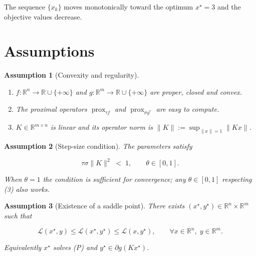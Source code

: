 \documentclass{article}
\newtheorem{assumption}{Assumption}
\newcommand{\prox}{\operatorname{prox}}
\newcommand{\R}{\mathbb{R}}
\begin{document}
The sequence $\{x_k\}$ moves monotonically toward the optimum $x^{\star}=3$ and the objective values decrease.

\newpage
\section*{Assumptions}
\begin{assumption}[Convexity and regularity]\label{as:conv}
\begin{enumerate}
\item $f:\R^{n}\to\R\cup\{+\infty\}$ and $g:\R^{m}\to\R\cup\{+\infty\}$ are proper, closed and convex.
\item The proximal operators $\prox_{\tau f}$ and $\prox_{\sigma g^{*}}$ are easy to compute.
\item $K\in\R^{m\times n}$ is linear and its operator norm is $\|K\|:=\sup_{\|x\|=1}\|Kx\|$.
\end{enumerate}
\end{assumption}

\begin{assumption}[Step‑size condition]\label{as:steps}
The parameters satisfy  

\[
\tau\sigma\|K\|^{2}\;<\;1,\qquad \theta\in[0,1].
\tag{3}
\]

When $\theta=1$ the condition is sufficient for convergence; any $\theta\in[0,1]$ respecting (3) also works.
\end{assumption}

\begin{assumption}[Existence of a saddle point]\label{as:saddle}
There exists $(x^{\star},y^{\star})\in\R^{n}\times\R^{m}$ such that  

\[
\mathcal{L}(x^{\star},y)\le \mathcal{L}(x^{\star},y^{\star})\le \mathcal{L}(x,y^{\star}),\qquad\forall x\in\R^{n},\;y\in\R^{m}.
\tag{4}
\]

Equivalently $x^{\star}$ solves (P) and $y^{\star}\in\partial g(Kx^{\star})$.
\end{assumption}
\end{document}
